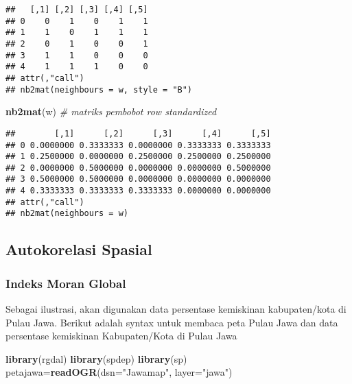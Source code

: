 \documentclass[
]{book}
\newenvironment{Shaded}{\begin{snugshade}}{\end{snugshade}}
\newcommand{\CommentTok}[1]{\textcolor[rgb]{0.56,0.35,0.01}{\textit{#1}}}
\newcommand{\DataTypeTok}[1]{\textcolor[rgb]{0.13,0.29,0.53}{#1}}
\newcommand{\KeywordTok}[1]{\textcolor[rgb]{0.13,0.29,0.53}{\textbf{#1}}}
\newcommand{\NormalTok}[1]{#1}
\newcommand{\StringTok}[1]{\textcolor[rgb]{0.31,0.60,0.02}{#1}}
\begin{document}
\begin{verbatim}
##   [,1] [,2] [,3] [,4] [,5]
## 0    0    1    0    1    1
## 1    1    0    1    1    1
## 2    0    1    0    0    1
## 3    1    1    0    0    0
## 4    1    1    1    0    0
## attr(,"call")
## nb2mat(neighbours = w, style = "B")
\end{verbatim}

\begin{Shaded}
\begin{Highlighting}[]
\KeywordTok{nb2mat}\NormalTok{(w) }\CommentTok{\# matriks pembobot row standardized}
\end{Highlighting}
\end{Shaded}

\begin{verbatim}
##        [,1]      [,2]      [,3]      [,4]      [,5]
## 0 0.0000000 0.3333333 0.0000000 0.3333333 0.3333333
## 1 0.2500000 0.0000000 0.2500000 0.2500000 0.2500000
## 2 0.0000000 0.5000000 0.0000000 0.0000000 0.5000000
## 3 0.5000000 0.5000000 0.0000000 0.0000000 0.0000000
## 4 0.3333333 0.3333333 0.3333333 0.0000000 0.0000000
## attr(,"call")
## nb2mat(neighbours = w)
\end{verbatim}

\hypertarget{autokorelasi-spasial}{%
\subsection{Autokorelasi Spasial}\label{autokorelasi-spasial}}

\hypertarget{indeks-moran-global}{%
\subsubsection{Indeks Moran Global}\label{indeks-moran-global}}

Sebagai ilustrasi, akan digunakan data persentase kemiskinan kabupaten/kota di Pulau Jawa. Berikut adalah syntax untuk membaca peta Pulau Jawa dan data persentase kemiskinan Kabupaten/Kota di Pulau Jawa

\begin{Shaded}
\begin{Highlighting}[]
\KeywordTok{library}\NormalTok{(rgdal)}
\KeywordTok{library}\NormalTok{(spdep)}
\KeywordTok{library}\NormalTok{(sp)}
\NormalTok{petajawa=}\KeywordTok{readOGR}\NormalTok{(}\DataTypeTok{dsn=}\StringTok{"Jawamap"}\NormalTok{, }\DataTypeTok{layer=}\StringTok{"jawa"}\NormalTok{)}
\end{Highlighting}
\end{Shaded}
\end{document}
